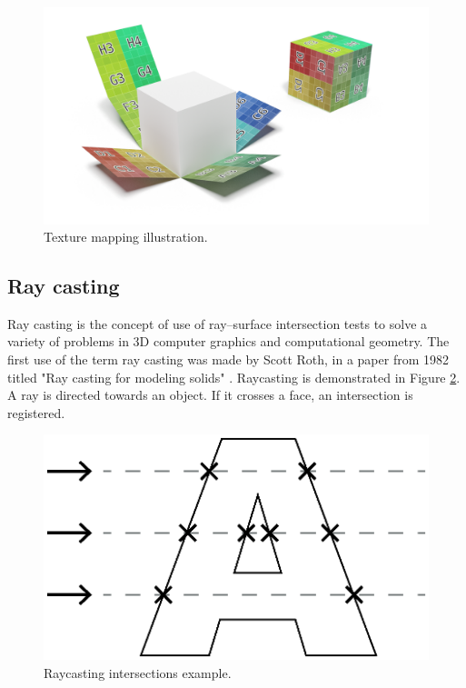 \begin{figure}[ht]
    \centering
    \includegraphics[width=\textwidth]{sections/theory/figures/texture-mapping.png}
    \caption{Texture mapping illustration.}
    \label{fig:texture-mapping}
\end{figure}

\subsection{Ray casting}
\label{sec:theory-raycasting}
Ray casting is the concept of use of ray–surface intersection tests to solve a variety of problems in 3D computer graphics and computational geometry. 
The first use of the term ray casting was made by Scott Roth, in a paper from 1982 titled "Ray casting for modeling solids" \cite{roth-ray-casting}. Raycasting is demonstrated in Figure \ref{fig:raycasting-intersections-example}. A ray is directed towards an object. If it crosses a face, an intersection is registered.

\begin{figure}[ht]
    \centering
    \includegraphics[scale=0.8]{sections/theory/figures/raycast-intersections}
    \caption{Raycasting intersections example.}
    \label{fig:raycasting-intersections-example}
\end{figure}

